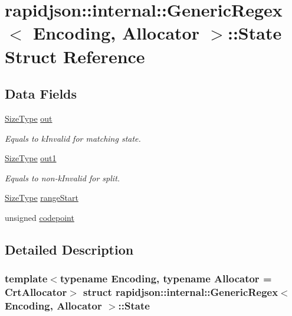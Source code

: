\hypertarget{structrapidjson_1_1internal_1_1_generic_regex_1_1_state}{}\section{rapidjson\+::internal\+::Generic\+Regex$<$ Encoding, Allocator $>$\+::State Struct Reference}
\label{structrapidjson_1_1internal_1_1_generic_regex_1_1_state}
\subsection*{Data Fields}
\begin{DoxyCompactItemize}
\item 
\mbox{\hyperlink{namespacerapidjson_a44eb33eaa523e36d466b1ced64b85c84}{Size\+Type}} \mbox{\hyperlink{structrapidjson_1_1internal_1_1_generic_regex_1_1_state_a6df788d7a28b25c65a20068dfdbe2fe1}{out}}
\begin{DoxyCompactList}\small\item\em Equals to k\+Invalid for matching state. \end{DoxyCompactList}\item 
\mbox{\hyperlink{namespacerapidjson_a44eb33eaa523e36d466b1ced64b85c84}{Size\+Type}} \mbox{\hyperlink{structrapidjson_1_1internal_1_1_generic_regex_1_1_state_aae1c31692a87d24a3ee023c49bd7da69}{out1}}
\begin{DoxyCompactList}\small\item\em Equals to non-\/k\+Invalid for split. \end{DoxyCompactList}\item 
\mbox{\hyperlink{namespacerapidjson_a44eb33eaa523e36d466b1ced64b85c84}{Size\+Type}} \mbox{\hyperlink{structrapidjson_1_1internal_1_1_generic_regex_1_1_state_aab2551bea6dd0e7d35eb705e6e23d19c}{range\+Start}}
\item 
unsigned \mbox{\hyperlink{structrapidjson_1_1internal_1_1_generic_regex_1_1_state_a82300a910e978ec41675df725d87dcd3}{codepoint}}
\end{DoxyCompactItemize}


\subsection{Detailed Description}
\subsubsection*{template$<$typename Encoding, typename Allocator = Crt\+Allocator$>$\newline
struct rapidjson\+::internal\+::\+Generic\+Regex$<$ Encoding, Allocator $>$\+::\+State}



